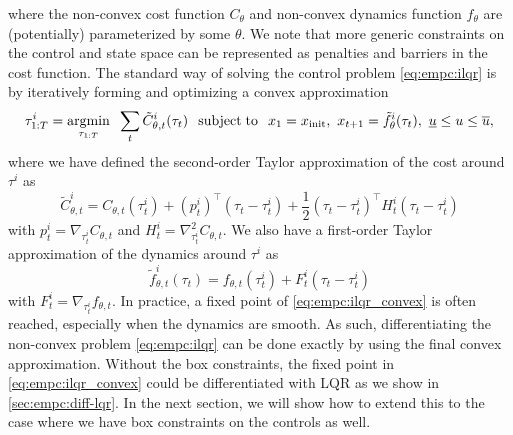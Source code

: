 where the non-convex cost function $C_\theta$ and non-convex
dynamics function $f_\theta$ are (potentially) parameterized
by some $\theta$.
We note that more generic constraints on the control
and state space can be represented as penalties and barriers
in the cost function.
The standard way of solving the control problem
\cref{eq:empc:ilqr} is by iteratively forming and
optimizing a convex approximation
\begin{equation}
  \label{eq:empc:ilqr_convex}
    \tau_{1:T}^i = \operatorname*{argmin}_{\tau_{1:T}}\;\; \sum_t \tilde C_{\theta,t}^i(\tau_t) \;\;
    \operatorname*{subject\;to}\;\;
    x_1 = x_{\rm init},\
    x_{t+1} = \tilde f_\theta^i(\tau_t),\
    \underline{u} \leq u \leq \overline{u},
\end{equation}
where we have defined the second-order Taylor approximation of the
cost around $\tau^i$ as
\begin{equation}
  \label{eq:empc:ilqr-cost-taylor}
  \tilde C_{\theta,t}^i = C_{\theta,t}(\tau_t^i) + (p_t^i)^\top (\tau_t-\tau_t^i) +
  \frac{1}{2} (\tau_t-\tau_t^i)^\top  H_t^i(\tau_t-\tau_t^i)
\end{equation}
with $p_t^i=\nabla_{\tau_t^i} C_{\theta,t}$ and
$H_t^i=\nabla_{\tau_t^i}^2 C_{\theta,t}$.
We also have a first-order Taylor approximation of the dynamics around $\tau^i$
as
\begin{equation}
  \label{eq:empc:ilqr-dynamics-taylor}
  \tilde f_{\theta,t}^i(\tau_t) = f_{\theta,t}(\tau_t^i) + F_t^i(\tau_t-\tau_t^i)
\end{equation}
with $F_t^i=\nabla_{\tau_t^i} f_{\theta,t}$.
In practice, a fixed point of \cref{eq:empc:ilqr_convex} is often
reached, especially when the dynamics are smooth.
As such, differentiating the non-convex problem \cref{eq:empc:ilqr}
can be done exactly by using the final
convex approximation.
Without the box constraints, the fixed point in
\cref{eq:empc:ilqr_convex} could be differentiated
with LQR as we show in \cref{sec:empc:diff-lqr}.
In the next section, we will show how to extend this to the case where we have box constraints on the controls as well.

